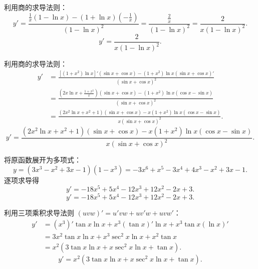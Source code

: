 \begin{solution}

    利用商的求导法则：
    \begin{equation}
        y' = \frac{\frac{1}{x}(1-\ln x) - (1+\ln x)\left(-\frac{1}{x}\right)}{(1-\ln x)^2} = \frac{\frac{2}{x}}{(1-\ln x)^2} = \frac{2}{x(1-\ln x)^2}.
    \end{equation}
    \begin{equation}
        \boxed{y' = \frac{2}{x(1-\ln x)^2}.}
    \end{equation}


    利用商的求导法则：
    \begin{equation}
        \begin{aligned}
            y' & = \frac{\left[(1+x^2)\ln x\right]'(\sin x+\cos x) - (1+x^2)\ln x (\sin x+\cos x)'}{(\sin x+\cos x)^2}              \\
               & = \frac{\left( 2x\ln x + \frac{1+x^2}{x} \right)(\sin x+\cos x) - (1+x^2)\ln x (\cos x-\sin x)}{(\sin x+\cos x)^2} \\
               & = \frac{(2x^2\ln x + x^2 + 1)(\sin x + \cos x) - x(1+x^2)\ln x(\cos x - \sin x)}{x(\sin x + \cos x)^2}.
        \end{aligned}
    \end{equation}
    \begin{equation}
        \boxed{y' = \frac{(2x^2\ln x + x^2 + 1)(\sin x + \cos x) - x(1+x^2)\ln x(\cos x - \sin x)}{x(\sin x + \cos x)^2}.}
    \end{equation}


    将原函数展开为多项式：
    \begin{equation}
        y = (3x^3 - x^2 + 3x - 1)(1 - x^3) = -3x^6 + x^5 - 3x^4 + 4x^3 - x^2 + 3x - 1.
    \end{equation}
    逐项求导得
    \begin{equation}
        y' = -18x^5 + 5x^4 - 12x^3 + 12x^2 - 2x + 3.
    \end{equation}
    \begin{equation}
        \boxed{y' = -18x^5 + 5x^4 - 12x^3 + 12x^2 - 2x + 3.}
    \end{equation}


    利用三项乘积求导法则 $(uvw)' = u'vw + uv'w + uvw'$：
    \begin{equation}
        \begin{aligned}
            y' & = (x^3)' \tan x \ln x + x^3 (\tan x)' \ln x + x^3 \tan x (\ln x)' \\
               & = 3x^2 \tan x \ln x + x^3 \sec^2 x \ln x + x^2 \tan x             \\
               & = x^2 (3\tan x \ln x + x\sec^2 x \ln x + \tan x).
        \end{aligned}
    \end{equation}
    \begin{equation}
        \boxed{y' = x^2 (3\tan x \ln x + x\sec^2 x \ln x + \tan x).}
    \end{equation}
\end{solution}

